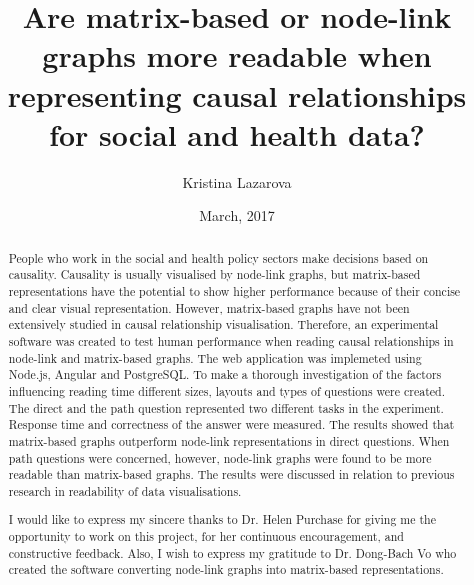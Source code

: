 \documentclass{l4proj}
\begin{document}
\title{Are matrix-based or node-link graphs more readable when representing causal relationships for social and health data?}
\author{Kristina Lazarova}
\date{March, 2017}
\maketitle


\begin{abstract}

People who work in the social and health policy sectors make decisions based on causality. Causality is usually visualised by node-link graphs, but matrix-based representations have the potential to show higher performance because of their concise and clear visual representation. However, matrix-based graphs have not been extensively studied in causal relationship visualisation. Therefore, an experimental software was created to test human performance when reading causal relationships in node-link and matrix-based graphs. The web application was implemeted using Node.js, Angular and PostgreSQL. To make a thorough investigation of the factors influencing reading time different sizes, layouts and types of questions were created. The direct and the path question represented two different tasks in the experiment. Response time and correctness of the answer were measured. The results showed that matrix-based graphs outperform node-link representations in direct questions. When path questions were concerned, however, node-link graphs were found to be more readable than matrix-based graphs. The results were discussed in relation to previous research in readability of data visualisations.

\end{abstract}


\renewcommand{\abstractname}{Acknowledgements}
\begin{abstract}
I would like to express my sincere thanks to Dr. Helen Purchase for giving me the opportunity to work on this project, for her continuous encouragement, and constructive feedback. Also, I wish to express my gratitude to Dr. Dong-Bach Vo who created the software converting node-link graphs into matrix-based representations. 

\end{abstract}


\educationalconsent
%
%
\tableofcontents
\end{document}

